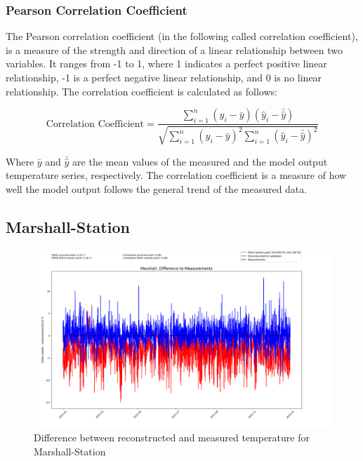 \subsubsection*{Pearson Correlation Coefficient}

The Pearson correlation coefficient (in the following called correlation coefficient), is a measure of the strength and direction of a linear relationship between two variables. It ranges from -1 to 1, where 1 indicates a perfect positive linear relationship, -1 is a perfect negative linear relationship, and 0 is no linear relationship. The correlation coefficient is calculated as follows:

\begin{equation}
    \text{Correlation Coefficient} = \frac{\sum_{i=1}^{n} (y_i - \bar{y})(\hat{y}_i - \bar{\hat{y}})}{\sqrt{\sum_{i=1}^{n} (y_i - \bar{y})^2 \sum_{i=1}^{n} (\hat{y}_i - \bar{\hat{y}})^2}}
    \label{eq:correlation}
\end{equation}
    
Where $\bar{y}$ and $\bar{\hat{y}}$ are the mean values of the measured and the model output temperature series, respectively. The correlation coefficient is a measure of how well the model output follows the general trend of the measured data.


\subsection*{Marshall-Station}

\begin{figure}
    \centering
    \includegraphics[width=\textwidth]{resources/images/charts/marshall_eval_grib_final/Marshall, Difference to Measurements.png}
    \caption{Difference between reconstructed and measured temperature for Marshall-Station}
    \label{fig:marshall_diff}
\end{figure}

